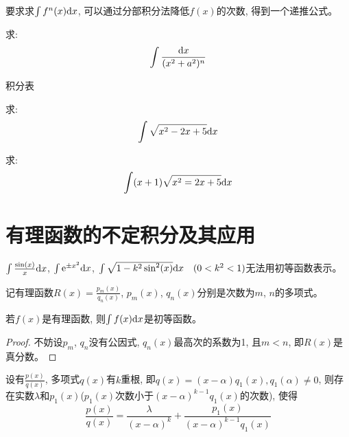\begin{remark}
    要求求$\int f^n(x) \mathrm{d} x$, 可以通过分部积分法降低$f(x)$的次数, 得到一个递推公式。
\end{remark}

\begin{example}
    求:
    \begin{equation}
        \int \frac{\mathrm{d} x}{(x^2+a^2)^n}
    \end{equation}
\end{example}
\begin{solution}
    
\end{solution}

积分表

\begin{example}
    求:
    \begin{equation*}
        \int \sqrt{x^2-2x+5} \mathrm{d} x
    \end{equation*}
\end{example}
\begin{solution}
    
\end{solution}

\begin{example}
    求:
    \begin{equation*}
        \int (x+1)\sqrt{x^2=2x+5} \mathrm{d} x
    \end{equation*}
\end{example}
\begin{solution}
    
\end{solution}

\section{有理函数的不定积分及其应用}
$\int \frac{\sin(x)}{x} \mathrm{d} x$, $\int \mathrm{e}^{\pm x^2} \mathrm{d} x$, $\int \sqrt{1-k^2\sin^2(x)} \mathrm{d} x \quad (0 < k^2 < 1)$无法用初等函数表示。

\begin{definition}[有理函数]
    记有理函数$R(x) = \frac{p_m(x)}{q_n(x)}$, $p_m(x)$, $q_n(x)$分别是次数为$m$, $n$的多项式。
\end{definition}

\begin{theorem}
    若$f(x)$是有理函数, 则$\int f(x) \mathrm{d} x$是初等函数。
\end{theorem}
\begin{proof}
    不妨设$p_m$, $q_n$没有公因式, $q_n(x)$最高次的系数为1, 且$m < n$, 即$R(x)$是真分数。
\end{proof}

\begin{theorem}
    设有$\frac{p(x)}{q(x)}$, 多项式$q(x)$有$k$重根, 即$q(x)=(x-\alpha)q_1(x), q_1(\alpha) \neq 0$, 则存在实数$\lambda$和$p_1(x)$($p_1(x)$次数小于$(x-\alpha)^{k-1}q_1(x)$的次数), 使得
    \begin{equation}
        \frac{p(x)}{q(x)} = \frac{\lambda}{(x-\alpha)^k} + \frac{p_1(x)}{(x-\alpha)^{k-1}q_1(x)}
    \end{equation}
\end{theorem}